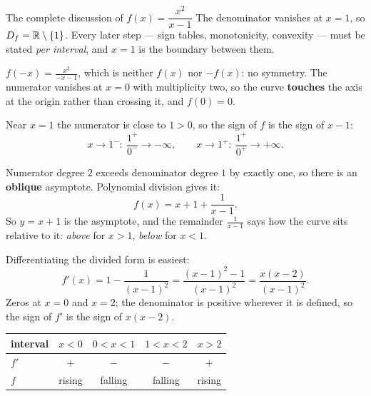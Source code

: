 \begin{worked}{The complete discussion of $f(x)=\dfrac{x^{2}}{x-1}$}
The denominator vanishes at $x=1$, so
$D_{f}=\mathbb{R}\setminus\{1\}$. Every later step --- sign tables, monotonicity,
convexity --- must be stated \emph{per interval}, and $x=1$ is the boundary
between them.

$f(-x)=\frac{x^{2}}{-x-1}$, which is neither $f(x)$ nor $-f(x)$: no
symmetry. The numerator vanishes at $x=0$ with multiplicity two, so the
curve \textbf{touches} the axis at the origin rather than crossing it, and
$f(0)=0$.

Near $x=1$ the numerator is close to $1>0$, so the sign of $f$ is the sign
of $x-1$:
\[
  x\to1^{-}:\ \frac{1^{+}}{0^{-}}\to-\infty,
  \qquad
  x\to1^{+}:\ \frac{1^{+}}{0^{+}}\to+\infty .
\]

Numerator degree $2$ exceeds denominator degree $1$ by exactly one, so there
is an \textbf{oblique} asymptote. Polynomial division gives it:
\[
  f(x)=x+1+\frac{1}{x-1} .
\]
So $y=x+1$ is the asymptote, and the remainder $\frac{1}{x-1}$ says how the
curve sits relative to it: \emph{above} for $x>1$, \emph{below} for $x<1$.

Differentiating the divided form is easiest:
\[
  f'(x)=1-\frac{1}{(x-1)^{2}}=\frac{(x-1)^{2}-1}{(x-1)^{2}}=\frac{x(x-2)}{(x-1)^{2}} .
\]
Zeros at $x=0$ and $x=2$; the denominator is positive wherever it is
defined, so the sign of $f'$ is the sign of $x(x-2)$.
\begin{center}\footnotesize
\begin{tabular}{lcccc}
  \hline
  interval & $x<0$ & $0<x<1$ & $1<x<2$ & $x>2$\\
  \hline
  $f'$ & $+$ & $-$ & $-$ & $+$\\
  $f$ & rising & falling & falling & rising\\
  \hline
\end{tabular}
\end{center}


\end{worked}
